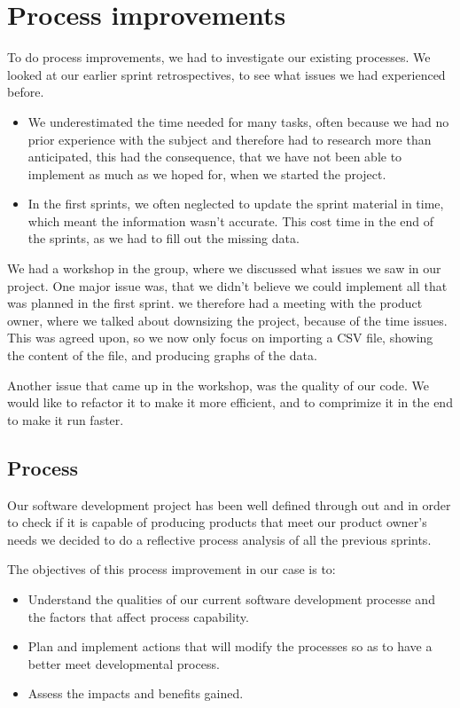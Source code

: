 \section{Process improvements} %
\label{sec:improvements}
To do process improvements, we had to investigate our existing processes. We looked at our earlier sprint retrospectives, to see what issues we had experienced before.
\begin{itemize}
	\item We underestimated the time needed for many tasks, often because we had no prior experience with the subject and therefore had to research more than anticipated, this had the consequence, that we have not been able to implement as much as we hoped for, when we started the project.
	\item In the first sprints, we often neglected to update the sprint material in time, which meant the information wasn't accurate. This cost time in the end of the sprints, as we had to fill out the missing data.
\end{itemize}

We had a workshop in the group, where we discussed what issues we saw in our project. One major issue was, that we didn't believe we could implement all that was planned in the first sprint.
we therefore had a meeting with the product owner, where we talked about downsizing the project, because of the time issues. This was agreed upon, so we now only focus on importing a CSV file, showing the content of the file, and producing graphs of the data.

Another issue that came up in the workshop, was the quality of our code. We would like to refactor it to make it more efficient, and to comprimize it in the end to make it run faster.
\subsection{Process} %
\label{sec:Process}

Our software development project has been well defined through out and in order to check if it is capable of producing products that meet our product owner's needs we decided to do a reflective process analysis of all the previous sprints.

The objectives of this process improvement in our case is to:

\begin{itemize}
	\item Understand the qualities of our current software development processe and the factors that affect process capability.
	\item Plan and implement actions that will modify the processes so as to have a better meet developmental process.
	\item Assess the impacts and benefits gained.
\end{itemize}

